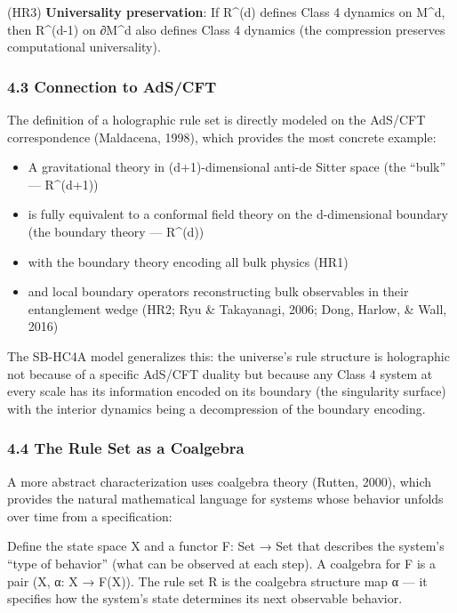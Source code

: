 \documentclass[
]{article}
\providecommand{\tightlist}{%
  \setlength{\itemsep}{0pt}\setlength{\parskip}{0pt}}
\begin{document}
(HR3) \textbf{Universality preservation}: If R\^{}(d) defines Class 4
dynamics on M\^{}d, then R\^{}(d-1) on ∂M\^{}d also defines Class 4
dynamics (the compression preserves computational universality).

\hypertarget{connection-to-adscft}{%
\subsubsection{4.3 Connection to AdS/CFT}\label{connection-to-adscft}}

The definition of a holographic rule set is directly modeled on the
AdS/CFT correspondence (Maldacena, 1998), which provides the most
concrete example:

\begin{itemize}
\tightlist
\item
  A gravitational theory in (d+1)-dimensional anti-de Sitter space (the
  ``bulk'' --- R\^{}(d+1))
\item
  is fully equivalent to a conformal field theory on the d-dimensional
  boundary (the boundary theory --- R\^{}(d))
\item
  with the boundary theory encoding all bulk physics (HR1)
\item
  and local boundary operators reconstructing bulk observables in their
  entanglement wedge (HR2; Ryu \& Takayanagi, 2006; Dong, Harlow, \&
  Wall, 2016)
\end{itemize}

The SB-HC4A model generalizes this: the universe's rule structure is
holographic not because of a specific AdS/CFT duality but because any
Class 4 system at every scale has its information encoded on its
boundary (the singularity surface) with the interior dynamics being a
decompression of the boundary encoding.

\hypertarget{the-rule-set-as-a-coalgebra}{%
\subsubsection{4.4 The Rule Set as a
Coalgebra}\label{the-rule-set-as-a-coalgebra}}

A more abstract characterization uses coalgebra theory (Rutten, 2000),
which provides the natural mathematical language for systems whose
behavior unfolds over time from a specification:

Define the state space X and a functor F: Set → Set that describes the
system's ``type of behavior'' (what can be observed at each step). A
coalgebra for F is a pair (X, α: X → F(X)). The rule set R is the
coalgebra structure map α --- it specifies how the system's state
determines its next observable behavior.
\end{document}
